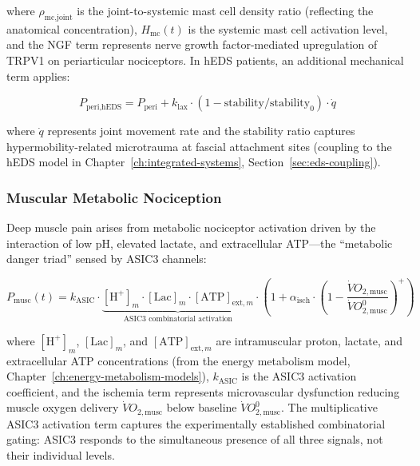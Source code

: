 where $\rho_{\text{mc,joint}}$ is the joint-to-systemic mast cell density ratio (reflecting the anatomical concentration), $H_{\text{mc}}(t)$ is the systemic mast cell activation level, and the NGF term represents nerve growth factor-mediated upregulation of TRPV1 on periarticular nociceptors. In hEDS patients, an additional mechanical term applies:

\begin{equation}
\label{eq:periarticular-heds}
P_{\text{peri,hEDS}} = P_{\text{peri}} + k_{\text{lax}} \cdot (1 - \text{stability}/\text{stability}_0) \cdot \dot{q}
\end{equation}

where $\dot{q}$ represents joint movement rate and the stability ratio captures hypermobility-related microtrauma at fascial attachment sites (coupling to the hEDS model in Chapter~\ref{ch:integrated-systems}, Section~\ref{sec:eds-coupling}).

\subsubsection{Muscular Metabolic Nociception}

Deep muscle pain arises from metabolic nociceptor activation driven by the interaction of low pH, elevated lactate, and extracellular ATP---the ``metabolic danger triad'' sensed by ASIC3 channels:

\begin{equation}
\label{eq:muscle-noci}
P_{\text{musc}}(t) = k_{\text{ASIC}} \cdot \underbrace{[\text{H}^+]_m \cdot [\text{Lac}]_m \cdot [\text{ATP}]_{\text{ext},m}}_{\text{ASIC3 combinatorial activation}} \cdot \left(1 + \alpha_{\text{isch}} \cdot \left(1 - \frac{\dot{V}O_{2,\text{musc}}}{\dot{V}O_{2,\text{musc}}^0}\right)^+\right)
\end{equation}

where $[\text{H}^+]_m$, $[\text{Lac}]_m$, and $[\text{ATP}]_{\text{ext},m}$ are intramuscular proton, lactate, and extracellular ATP concentrations (from the energy metabolism model, Chapter~\ref{ch:energy-metabolism-models}), $k_{\text{ASIC}}$ is the ASIC3 activation coefficient, and the ischemia term represents microvascular dysfunction reducing muscle oxygen delivery $\dot{V}O_{2,\text{musc}}$ below baseline $\dot{V}O_{2,\text{musc}}^0$. The multiplicative ASIC3 activation term captures the experimentally established combinatorial gating: ASIC3 responds to the simultaneous presence of all three signals, not their individual levels.

